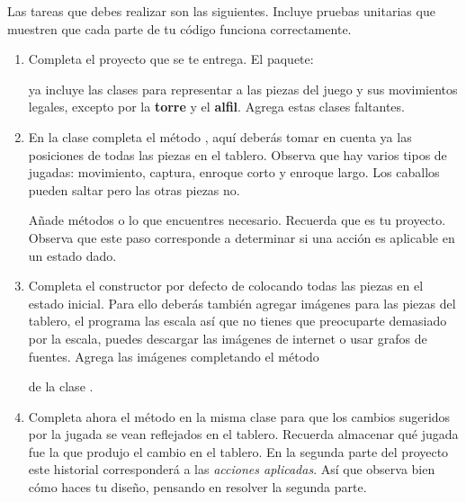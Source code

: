 Las tareas que debes realizar son las siguientes.  Incluye pruebas unitarias que muestren que cada parte de tu código funciona correctamente.

\begin{enumerate}
\subsubsection{Parte I: Reglas del ajedrez}
 \item Completa el proyecto que se te entrega.  El paquete:
\begin{center}
\end{center}
  ya incluye las clases para representar a las piezas del juego y sus movimientos legales, excepto por la \textbf{torre} y el \textbf{alfil}.  Agrega estas clases faltantes.

 \item En la clase  completa el método , aquí deberás tomar en cuenta ya las posiciones de todas las piezas en el tablero.  Observa que hay varios tipos de jugadas: movimiento, captura, enroque corto y enroque largo. Los caballos pueden saltar pero las otras piezas no.

 Añade métodos o lo que encuentres necesario.  Recuerda que es tu proyecto.  Observa que este paso corresponde a determinar si una acción es aplicable en un estado dado.

 \item Completa el constructor por defecto de  colocando todas las piezas en el estado inicial.  Para ello deberás también agregar imágenes para las piezas del tablero, el programa las escala así que no tienes que preocuparte demasiado por la escala, puedes descargar las imágenes de internet o usar grafos de fuentes.  Agrega las imágenes completando el método
 \begin{center}
 \end{center}
 de la clase .


 \item Completa ahora el método  en la misma clase para que los cambios sugeridos por la jugada se vean reflejados en el tablero.  Recuerda almacenar qué jugada fue la que produjo el cambio en el tablero.  En la segunda parte del proyecto este historial corresponderá a las \emph{acciones aplicadas}.  Así que observa bien cómo haces tu diseño, pensando en resolver la segunda parte.


\end{enumerate}
